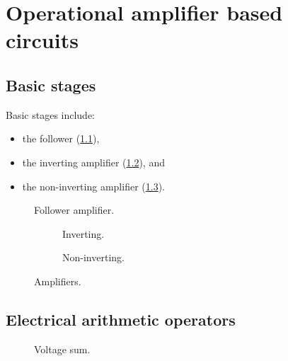 
\chapter{Operational amplifier based circuits}



\section{Basic stages}


	Basic stages include:
	\begin{itemize}
		\item the follower (\cref{fig__opamp__basic_stage__follower}),
		\item the inverting amplifier (\cref{fig__opamp__basic_stage__amp_inv}), and 
		\item the non-inverting amplifier (\cref{fig__opamp__basic_stage__amp_ninv}).
	\end{itemize}


	\begin{figure}[htb]
		\centering
		
		\caption{Follower amplifier.%
			\label{fig__opamp__basic_stage__follower}}
	\end{figure}

	\begin{figure}[htb!]
		\centering
		\begin{subfigure}[b]{0.8\textwidth}
			\centering
			
			\caption{Inverting.%
				\label{fig__opamp__basic_stage__amp_inv}}
			\vspace*{3ex}
		\end{subfigure}
		\begin{subfigure}[b]{0.8\textwidth}
			\centering
			
			\caption{Non-inverting.%
				\label{fig__opamp__basic_stage__amp_ninv}}
		\end{subfigure}
		\caption{Amplifiers.%
			\label{fig__opamp__basic_stage__amp}}
	\end{figure}



\section{Electrical arithmetic operators}


	\begin{figure}[htb]
		\centering
		
		\caption{Voltage sum.%
			\label{fig__opamp__arithm_op__Vsum}}
	\end{figure}



